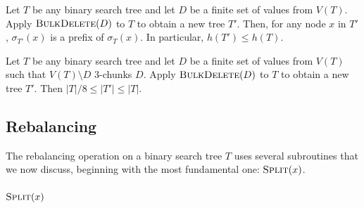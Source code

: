 \documentclass[10pt, conference, compsocconf]{IEEEtran}
\let\le\leqslant
\let\ge\geqslant
\let\leq\leqslant
\let\geq\geqslant
\begin{document}
\begin{lem}
  Let $T$ be any binary search tree and let $D$ be a finite set of values from $V(T)$.
  Apply $\textsc{BulkDelete}(D)$ to $T$ to obtain a new tree $T'$.
  Then, for any node $x$ in $T'$, $\sigma_{T'}(x)$ is a prefix of $\sigma_T(x)$.
  In particular, $h(T')\leq h(T)$.
\end{lem}


\begin{lem}
  Let $T$ be any binary search tree and let $D$ be a finite set of values from $V(T)$ such that $V(T)\setminus D$ $3$-chunks $D$.
  Apply $\textsc{BulkDelete}(D)$ to $T$ to obtain a new tree $T'$.
  Then $|T|/8 \le |T'|\le |T|$.
\end{lem}


\subsection{Rebalancing}

The rebalancing operation on a binary search tree $T$ uses several subroutines that we now discuss, beginning with the most fundamental one:  $\textsc{Split}(x)$.

\subsubsection{$\textsc{Split}(x)$}
\end{document}
